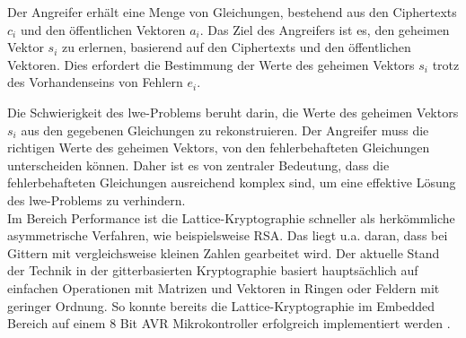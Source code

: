 Der Angreifer erhält eine Menge von Gleichungen, bestehend aus den Ciphertexts $c_i$ und den öffentlichen Vektoren $a_i$. Das Ziel des Angreifers ist es, den geheimen Vektor $s_i$ zu erlernen, basierend auf den Ciphertexts und den öffentlichen Vektoren. Dies erfordert die Bestimmung der Werte des geheimen Vektors $s_i$ trotz des Vorhandenseins von Fehlern $e_i$.

Die Schwierigkeit des \ac{lwe}-Problems beruht darin, die Werte des geheimen Vektors $s_i$ aus den gegebenen Gleichungen zu rekonstruieren. Der Angreifer muss die richtigen Werte des geheimen Vektors, von den fehlerbehafteten Gleichungen unterscheiden können. Daher ist es von zentraler Bedeutung, dass die fehlerbehafteten Gleichungen ausreichend komplex sind, um eine effektive Lösung des \ac{lwe}-Problems zu verhindern.\\

Im Bereich Performance ist die Lattice-Kryptographie schneller als herkömmliche asymmetrische Verfahren, wie beispielsweise RSA. Das liegt u.a. daran, dass bei Gittern mit vergleichsweise kleinen Zahlen gearbeitet wird. Der aktuelle Stand der Technik in der gitterbasierten Kryptographie basiert hauptsächlich auf einfachen Operationen mit Matrizen und Vektoren in Ringen oder Feldern mit geringer Ordnung. So konnte bereits die Lattice-Kryptographie im Embedded Bereich auf einem 8 Bit AVR Mikrokontroller erfolgreich implementiert werden \cite*[Abs. 3]{wang_lattice-based_2023}.

